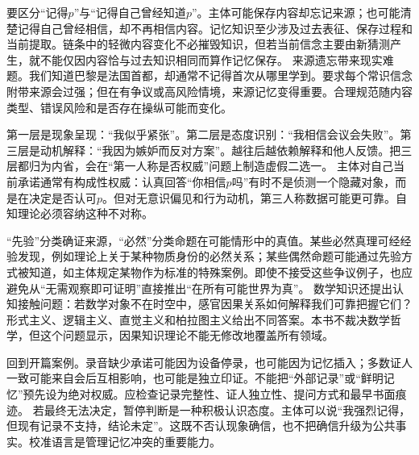 要区分“记得$p$”与“记得自己曾经知道$p$”。主体可能保存内容却忘记来源；也可能清楚记得自己曾经相信，却不再相信内容。记忆知识至少涉及过去表征、保存过程和当前提取。链条中的轻微内容变化不必摧毁知识，但若当前信念主要由新猜测产生，就不能仅因内容恰与过去知识相同而算作记忆保存。 来源遗忘带来现实难题。我们知道巴黎是法国首都，却通常不记得首次从哪里学到。要求每个常识信念附带来源会过强；但在有争议或高风险情境，来源记忆变得重要。合理规范随内容类型、错误风险和是否存在操纵可能而变化。

第一层是现象呈现：“我似乎紧张”。第二层是态度识别：“我相信会议会失败”。第三层是动机解释：“我因为嫉妒而反对方案”。越往后越依赖解释和他人反馈。把三层都归为内省，会在“第一人称是否权威”问题上制造虚假二选一。 主体对自己当前承诺通常有构成性权威：认真回答“你相信$p$吗”有时不是侦测一个隐藏对象，而是在决定是否认可$p$\parencite{moran2001}。但对无意识偏见和行为动机，第三人称数据可能更可靠。自知理论必须容纳这种不对称。

“先验”分类确证来源，“必然”分类命题在可能情形中的真值。某些必然真理可经经验发现，例如理论上关于某种物质身份的必然关系；某些偶然命题可能通过先验方式被知道，如主体规定某物作为标准的特殊案例。即使不接受这些争议例子，也应避免从“无需观察即可证明”直接推出“在所有可能世界为真”。 数学知识还提出认知接触问题：若数学对象不在时空中，感官因果关系如何解释我们可靠把握它们？形式主义、逻辑主义、直觉主义和柏拉图主义给出不同答案。本书不裁决数学哲学，但这个问题显示，因果知识理论不能无修改地覆盖所有领域。

回到开篇案例。录音缺少承诺可能因为设备停录，也可能因为记忆插入；多数证人一致可能来自会后互相影响，也可能是独立印证。不能把“外部记录”或“鲜明记忆”预先设为绝对权威。应检查记录完整性、证人独立性、提问方式和最早书面痕迹。 若最终无法决定，暂停判断是一种积极认识态度。主体可以说“我强烈记得，但现有记录不支持，结论未定”。这既不否认现象确信，也不把确信升级为公共事实。校准语言是管理记忆冲突的重要能力。
